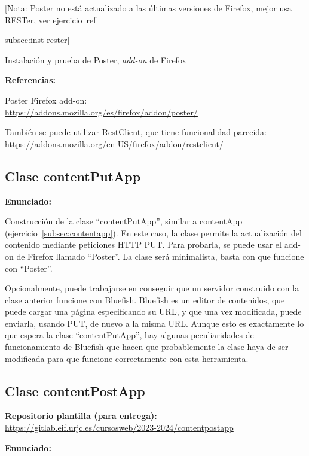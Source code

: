 [Nota: Poster no está actualizado a las últimas versiones de Firefox, mejor usa RESTer, ver ejercicio~ref{{subsec:inst-rester}]
  
Instalación y prueba de Poster, \emph{add-on} de Firefox

\textbf{Referencias:}

Poster Firefox add-on: \\
\url{https://addons.mozilla.org/es/firefox/addon/poster/}

También se puede utilizar RestClient, que tiene funcionalidad parecida: \\
\url{https://addons.mozilla.org/en-US/firefox/addon/restclient/}

\subsection{Clase contentPutApp}
\label{subsec:contentputapp}

\textbf{Enunciado:}

Construcción de la clase ``contentPutApp'', similar a contentApp (ejercicio~\ref{subsec:contentapp}). En este caso, la clase permite la actualización del contenido mediante peticiones HTTP PUT. Para probarla, se puede usar el add-on de Firefox llamado ``Poster''. La clase será minimalista, basta con que funcione con ``Poster''.

Opcionalmente, puede trabajarse en conseguir que un servidor construido con la clase anterior funcione con Bluefish. Bluefish es un editor de contenidos, que puede cargar una página especificando su URL, y que una vez modificada, puede enviarla, usando PUT, de nuevo a la misma URL. Aunque esto es exactamente lo que espera la clase ``contentPutApp'', hay algunas peculiaridades de funcionamiento de Bluefish que hacen que probablemente la clase haya de ser modificada para que funcione correctamente con esta herramienta.

\subsection{Clase contentPostApp}
\label{subsec:contentpostapp}

\textbf{Repositorio plantilla (para entrega):} \\
\url{https://gitlab.eif.urjc.es/cursosweb/2023-2024/contentpostapp}

\textbf{Enunciado:}

}
